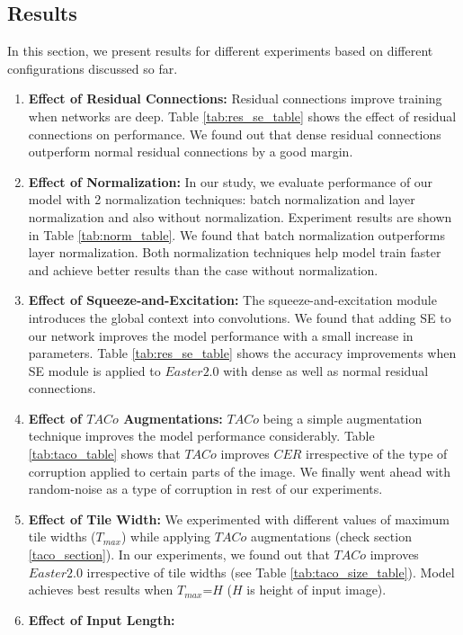 \documentclass{article}
\begin{document}
\subsection{Results}
In this section, we present results for different experiments based on different configurations discussed so far.
\begin{enumerate}
    \item \textbf{Effect of Residual Connections: }
    Residual connections improve training when networks are deep. Table \ref{tab:res_se_table} shows the effect of residual connections on performance. We found out that dense residual connections outperform normal residual connections by a good margin. 
    \item \textbf{Effect of Normalization: }
    In our study, we evaluate performance of our model with 2 normalization techniques: batch normalization\cite{ioffe2015batch} and layer normalization\cite{ba2016layer} and also without normalization. Experiment results are shown in Table \ref{tab:norm_table}. We found that batch normalization outperforms layer normalization. Both normalization techniques help model train faster and achieve better results than the case without normalization.
    \item \textbf{Effect of Squeeze-and-Excitation: }
    The squeeze-and-excitation module introduces the global context into convolutions. We found that adding SE to our network improves the model performance with a small increase in parameters. Table \ref{tab:res_se_table} shows the accuracy improvements when SE module is applied to $Easter2.0$ with dense as well as normal residual connections.
    \item \textbf{Effect of $TACo$ Augmentations: }
    $TACo$ being a simple augmentation technique improves the model performance considerably. Table \ref{tab:taco_table} shows that $TACo$ improves $CER$ irrespective of the type of corruption applied to certain parts of the image. We finally went ahead with random-noise as a type of corruption in rest of our experiments.
    \item \textbf{Effect of Tile Width: }
    We experimented with different values of maximum tile widths ($T_{max}$) while applying $TACo$ augmentations (check section \ref{taco_section}). In our experiments, we found out that $TACo$ improves $Easter2.0$ irrespective of tile widths (see Table \ref{tab:taco_size_table}). Model achieves best results when $T_{max}$=$H$ ($H$ is height of input image).
    \item \textbf{Effect of Input Length: }

\end{enumerate}
\end{document}
